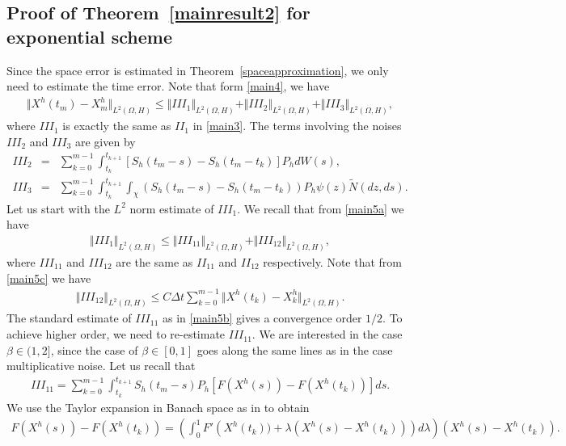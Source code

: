 \documentclass[review,12pt]{elsarticle}
\newcommand{\thmref}[1]{{Theorem~\ref{#1}}}
\begin{document}
\subsection{Proof of \thmref{mainresult2} for exponential scheme}
Since the space error is estimated in \thmref{spaceapproximation}, we only need to estimate the time error. Note that form \eqref{main4}, we have
\begin{eqnarray}
\label{lun1}
\Vert X^h(t_m)-X^h_m\Vert_{L^2(\Omega, H)}\leq \Vert III_1\Vert_{L^2(\Omega, H)}+\Vert III_2\Vert_{L^2(\Omega, H)}+\Vert III_3\Vert_{L^2(\Omega, H)},
\end{eqnarray}
where $III_1$ is exactly the same as $II_1$ in \eqref{main3}. The terms involving the noises $III_2$ and $III_3$ are given by
\begin{eqnarray}
\label{lun2}
III_2&=&\sum_{k=0}^{m-1}\int_{t_k}^{t_{k+1}}\left[S_h(t_m-s)-S_h(t_m-t_k)\right]P_hdW(s),\\
III_3&=&\sum_{k=0}^{m-1}\int_{t_k}^{t_{k+1}}\int_{\chi}\left(S_h(t_m-s)-S_h(t_m-t_k)\right)P_h\psi(z)\widetilde{N}(dz, ds).
\end{eqnarray}
Let us start with the $L^2$ norm estimate of $III_1$. We recall that from \eqref{main5a} we have
\begin{eqnarray}
\label{lun3}
\Vert III_1\Vert_{L^2(\Omega, H)}\leq \Vert III_{11}\Vert_{L^2(\Omega, H)}+\Vert III_{12}\Vert_{L^2(\Omega, H)}, 
\end{eqnarray}
where $III_{11}$ and $III_{12}$ are  the same as $II_{11}$ and $II_{12}$ respectively. Note that from \eqref{main5c} we have
\begin{eqnarray}
\label{lun4}
\Vert III_{12}\Vert_{L^2(\Omega, H)}\leq C\Delta t\sum_{k=0}^{m-1}\Vert X^h(t_k)-X^h_k\Vert_{L^2(\Omega, H)}.
\end{eqnarray}
The standard estimate of $III_{11}$ as in \eqref{main5b}  gives a convergence order $1/2$.
 To achieve higher order, we need to re-estimate $III_{11}$. We are interested in the case $\beta\in(1,2]$, since the case of $\beta\in[0, 1]$ goes along the same lines as in the case multiplicative noise.  Let us recall that
\begin{eqnarray}
\label{lun5}
III_{11}=\sum_{k=0}^{m-1}\int_{t_k}^{t_{k+1}}S_h(t_m-s)P_h[F(X^h(s))-F(X^h(t_k))]ds.
\end{eqnarray}
We use the Taylor expansion in Banach space as in \cite{Jentzen1} to obtain
\begin{eqnarray}
\label{Taylor1}
F(X^h(s))-F(X^h(t_k))=\left(\int_0^1F'\left(X^h(t_k))+\lambda\left(X^h(s)-X^h(t_k)\right)\right)d\lambda\right)\left(X^h(s)-X^h(t_k)\right).
\end{eqnarray}
\end{document}
